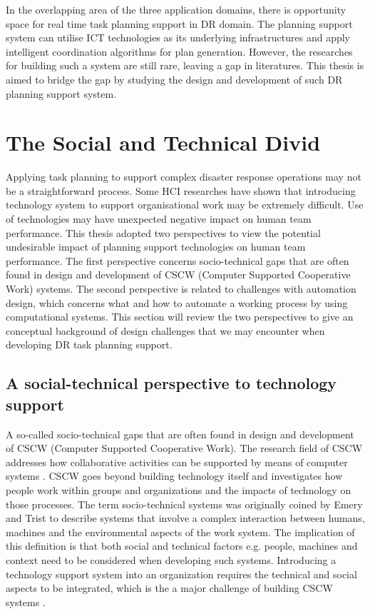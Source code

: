 In the overlapping area of the three application domains, there is opportunity space for real time task planning support in DR domain. The planning support system can utilise ICT technologies as its underlying infrastructures and apply intelligent coordination algorithms for plan generation. However, the researches for building such a system are still rare, leaving a gap in literatures. This thesis is aimed to bridge the gap by studying the design and development of such DR planning support system.\\

\section{The Social and Technical Divid}\label{sec:LRSocialTechnical}
Applying task planning to support complex disaster response operations may not be a straightforward process. Some HCI researches \cite{Ackerman2000,Bowers1994,Niazkhani2009} have shown that introducing technology system to support organisational work may be extremely difficult. Use of technologies may have unexpected negative impact on human team performance. This thesis adopted two perspectives to view the potential undesirable impact of planning support technologies on human team performance. The first perspective concerns socio-technical gaps that are often found in design and development of CSCW (Computer Supported Cooperative Work) systems. The second perspective is related to challenges with automation design, which concerns what and how to automate a working process by using computational systems. This section will review the two perspectives to give an conceptual background of design challenges that we may encounter when developing DR task planning support.\\


\subsection{A social-technical perspective to technology support}
A so-called socio-technical gaps that are often found in design and development of CSCW (Computer Supported Cooperative Work). The research field of CSCW addresses how collaborative activities can be supported by means of computer systems \cite{Carstensen1999}.  CSCW goes beyond building technology itself and investigates how people work within groups and organizations and the impacts of technology on those processes. The term socio-technical systems was originally coined by Emery and Trist \cite{Ropohl1999} to describe systems that involve a complex interaction between humans, machines and the environmental aspects of the work system. The implication of this definition is that both social and technical factors e.g. people, machines and context need to be considered when developing such systems. Introducing a technology support system into an organization requires the technical and social aspects to be integrated, which is the a major challenge of building CSCW systems \cite{Ackerman2000}. \\


